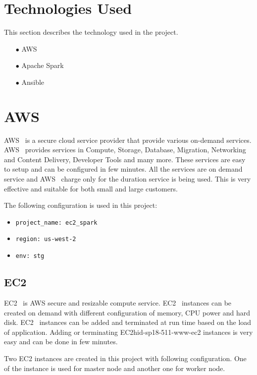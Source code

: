 \section{Technologies Used}
This section describes the technology used in the project.

\begin{itemize}
	\item[$\bullet$] AWS 
	\item[$\bullet$] Apache Spark 
	\item[$\bullet$] Ansible
\end{itemize}

\section{AWS}

AWS~\cite{hid-sp18-511-www-aws} is a secure cloud service provider
that provide various on-demand services.
AWS~\cite{hid-sp18-511-www-aws} provides services in Compute, Storage,
Database, Migration, Networking and Content Delivery, Developer Tools
and many more. These services are easy to setup and can be configured in few
minutes. All the services are on demand service and
AWS~\cite{hid-sp18-511-www-aws} charge only for the duration service is
being used. This is very effective and suitable for both small and
large customers.

The following configuration is used in this project:

\begin{itemize}
	\item \verb|project_name: ec2_spark|
	\item \verb|region: us-west-2|
	\item \verb|env: stg|
\end{itemize}


\subsection{EC2}

EC2~\cite{hid-sp18-511-www-ec2} is AWS secure and resizable compute
service. EC2~\cite{hid-sp18-511-www-ec2} instances can be created on
demand with different configuration of memory, CPU power and hard
disk. EC2~\cite{hid-sp18-511-www-ec2} instances can be added and
terminated at run time based on the load of application. Adding or
terminating EC2{hid-sp18-511-www-ec2} instances is very easy and can
be done in few minutes.

Two EC2 instances are created in this project with following
configuration. One of the instance is used for master node and another one
for worker node.

